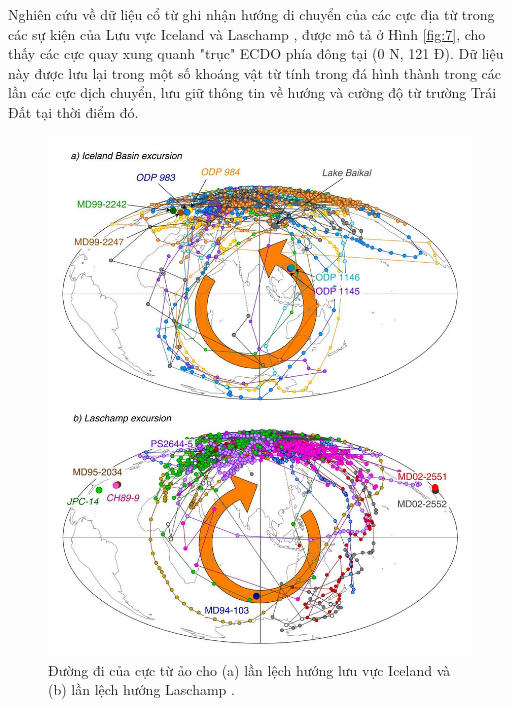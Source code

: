 \documentclass[10pt,twocolumn,letterpaper]{article}
\begin{document}
Nghiên cứu về dữ liệu cổ từ ghi nhận hướng di chuyển của các cực địa từ trong các sự kiện của Lưu vực Iceland và Laschamp \cite{35}, được mô tả ở Hình \ref{fig:7}, cho thấy các cực quay xung quanh "trục" ECDO phía đông tại (0 N, 121 Đ). Dữ liệu này được lưu lại trong một số khoáng vật từ tính trong đá hình thành trong các lần các cực dịch chuyển, lưu giữ thông tin về hướng và cường độ từ trường Trái Đất tại thời điểm đó.
\begin{figure}[t]
\begin{center}
   \includegraphics[width=0.95\linewidth]{laj.jpg}
\end{center}
   \caption{Đường đi của cực từ ảo cho (a) lần lệch hướng lưu vực Iceland và (b) lần lệch hướng Laschamp \cite{35}.}
\label{fig:7}
\label{fig:onecol}
\end{figure}
\end{document}
